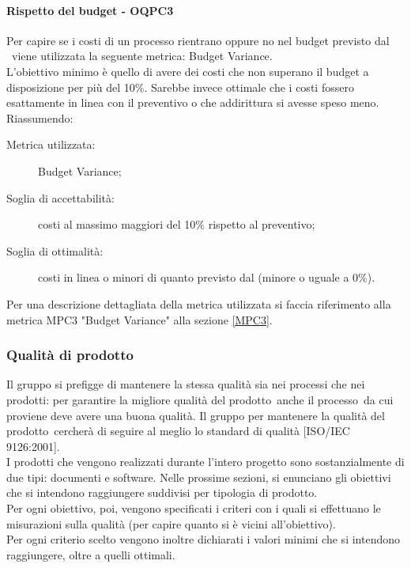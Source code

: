 \documentclass[../PianoDiQualifica.tex]{subfiles}
\begin{document}
		\paragraph{Rispetto del budget - OQPC3}
		Per capire se i costi di un processo rientrano oppure no nel budget previsto dal \pianodiprogetto\ viene utilizzata la seguente metrica: Budget Variance.\\
		L’obiettivo minimo è quello di avere dei costi che non superano il budget a disposizione per più del 10\%. Sarebbe invece ottimale che i costi fossero esattamente in linea con il preventivo o che addirittura si avesse speso meno.\\
		Riassumendo:
		\begin{description}
			\item[Metrica utilizzata:] Budget Variance;
			\item[Soglia di accettabilità:] costi al massimo maggiori del 10\% rispetto al preventivo;
			\item[Soglia di ottimalità:] costi in linea o minori di quanto previsto dal \pianodiprogetto (minore o uguale a 0\%).
		\end{description}
		Per una descrizione dettagliata della metrica utilizzata si faccia riferimento alla metrica MPC3 "Budget Variance" alla sezione \ref{MPC3}.
		
		\subsubsection{Qualità di prodotto}
		Il gruppo si prefigge di mantenere la stessa qualità sia nei processi che nei prodotti: per garantire la migliore qualità del prodotto\g\ anche il processo\g\ da cui proviene deve avere una buona qualità. Il gruppo per mantenere la qualità del prodotto\g\ cercherà di seguire al meglio lo standard di qualità [ISO/IEC 9126:2001].\\
		I prodotti che vengono realizzati durante l'intero progetto sono sostanzialmente di due tipi: documenti e software\g. Nelle prossime sezioni, si enunciano gli obiettivi che si intendono raggiungere suddivisi per tipologia di prodotto\g.\\
		Per ogni obiettivo, poi, vengono specificati i criteri con i quali si effettuano le misurazioni sulla qualità (per capire quanto si è vicini all’obiettivo).\\
		Per ogni criterio scelto vengono inoltre dichiarati i valori minimi che si intendono raggiungere, oltre a quelli ottimali.
				
\end{document}
